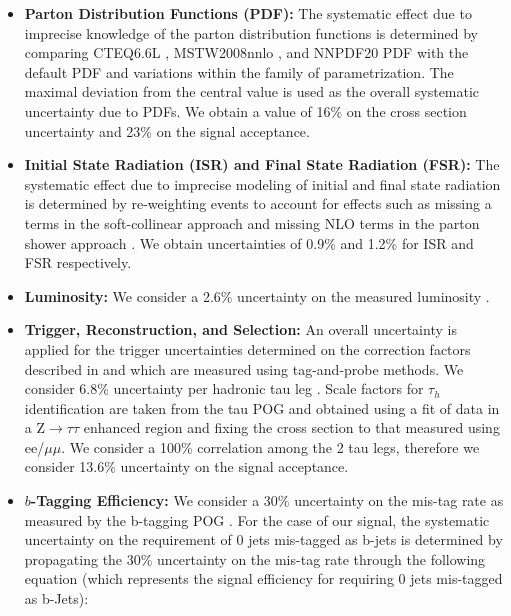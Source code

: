\begin{itemize}
	\item \textbf{Parton Distribution Functions (PDF):} The systematic effect due to imprecise knowledge of the parton distribution functions is determined by comparing CTEQ6.6L \cite{Nadolsky:2008zw}, MSTW2008nnlo \cite{Martin:2009iq}, and NNPDF20 PDF \cite{Ubiali:2008uk} with the default PDF and variations within the family of parametrization. The maximal deviation from the central value is used as the overall systematic uncertainty due to PDFs. We obtain a value of 16\% on the cross section uncertainty and 23\% on the signal acceptance.
	
	\item \textbf{Initial State Radiation (ISR) and Final State Radiation (FSR):} The systematic effect due to imprecise modeling of initial and final state radiation is determined by re-weighting events to account for effects such as missing a terms in the soft-collinear approach \cite{Nanava:2003cg} and missing NLO terms in the parton shower approach \cite{Miu:1998ju}. We obtain uncertainties of 0.9\% and 1.2\% for ISR and FSR respectively.
	
	\item \textbf{Luminosity:} We consider a 2.6\% uncertainty on the measured luminosity \cite{CMS:2012rua}.
	
	\item \textbf{Trigger, Reconstruction, and Selection:}  An overall uncertainty is applied for the trigger uncertainties determined on the correction factors described in \cite{bib:AN-12-321} and which are measured using tag-and-probe methods. We consider 6.8\% uncertainty per hadronic tau leg \cite{CMS:2011msa}. Scale factors for $\tau_{h}$ identification are taken from the tau POG and obtained using a fit of data in a Z$\to\tau\tau$ enhanced region and fixing the cross section to that measured using ee/$\mu\mu$. We consider a 100\% correlation among the 2 tau legs, therefore we consider 13.6\% uncertainty on the signal acceptance.
	
	\item \textbf{$b$-Tagging Efficiency:} We consider a 30\% uncertainty on the mis-tag rate as measured by the b-tagging POG \cite{CMS:2011cra}. For the case of our signal, the systematic uncertainty on the requirement of 0 jets mis-tagged as b-jets is determined by propagating the 30\% uncertainty on the mis-tag rate through the following equation (which represents the signal efficiency for requiring 0 jets mis-tagged as b-Jets):
	

\end{itemize}
